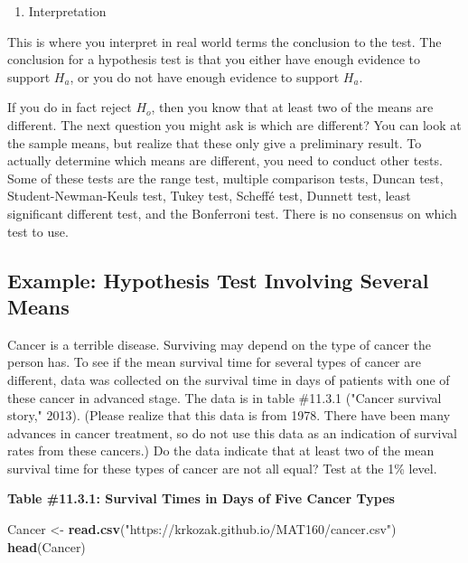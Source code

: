 \documentclass[]{book}
\newenvironment{Shaded}{\begin{snugshade}}{\end{snugshade}}
\newcommand{\KeywordTok}[1]{\textcolor[rgb]{0.13,0.29,0.53}{\textbf{#1}}}
\newcommand{\NormalTok}[1]{#1}
\newcommand{\StringTok}[1]{\textcolor[rgb]{0.31,0.60,0.02}{#1}}
\providecommand{\tightlist}{%
  \setlength{\itemsep}{0pt}\setlength{\parskip}{0pt}}
\begin{document}
\begin{enumerate}
\def\labelenumi{\arabic{enumi}.}
\setcounter{enumi}{5}
\tightlist
\item
  Interpretation
\end{enumerate}

This is where you interpret in real world terms the conclusion to the test. The conclusion for a hypothesis test is that you either have enough evidence to support \(H_a\), or you do not have enough evidence to support \(H_a\).

If you do in fact reject \(H_o\), then you know that at least two of the means are different. The next question you might ask is which are different? You can look at the sample means, but realize that these only give a preliminary result. To actually determine which means are different, you need to conduct other tests. Some of these tests are the range test, multiple comparison tests, Duncan test, Student-Newman-Keuls test, Tukey test, Scheffé test, Dunnett test, least significant different test, and the Bonferroni test. There is no consensus on which test to use.

\hypertarget{example-hypothesis-test-involving-several-means}{%
\subsection{Example: Hypothesis Test Involving Several Means}\label{example-hypothesis-test-involving-several-means}}

Cancer is a terrible disease. Surviving may depend on the type of cancer the person has. To see if the mean survival time for several types of cancer are different, data was collected on the survival time in days of patients with one of these cancer in advanced stage. The data is in table \#11.3.1 ("Cancer survival story," 2013). (Please realize that this data is from 1978. There have been many advances in cancer treatment, so do not use this data as an indication of survival rates from these cancers.) Do the data indicate that at least two of the mean survival time for these types of cancer are not all equal? Test at the 1\% level.

\textbf{Table \#11.3.1: Survival Times in Days of Five Cancer Types}

\begin{Shaded}
\begin{Highlighting}[]
\NormalTok{Cancer <-}\StringTok{ }\KeywordTok{read.csv}\NormalTok{(}\StringTok{"https://krkozak.github.io/MAT160/cancer.csv"}\NormalTok{)}
\KeywordTok{head}\NormalTok{(Cancer)}
\end{Highlighting}
\end{Shaded}
\end{document}
